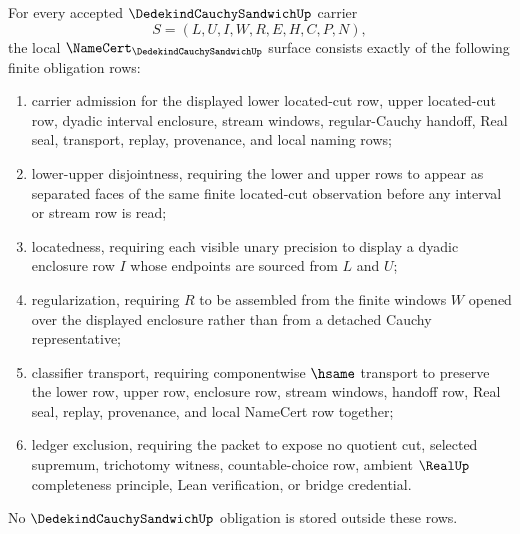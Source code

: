 \begin{theorem}
\label{thm:dedekind-cauchy-sandwich-namecert-obligations}
For every accepted $\DedekindCauchySandwichUp$ carrier
$$
S=(L,U,I,W,R,E,H,C,P,N),
$$
the local $\NameCert_{\DedekindCauchySandwichUp}$ surface consists exactly of the following finite obligation rows:
\begin{enumerate}
\item carrier admission for the displayed lower located-cut row, upper located-cut row, dyadic interval enclosure, stream windows, regular-Cauchy handoff, Real seal, transport, replay, provenance, and local naming rows;
\item lower-upper disjointness, requiring the lower and upper rows to appear as separated faces of the same finite located-cut observation before any interval or stream row is read;
\item locatedness, requiring each visible unary precision to display a dyadic enclosure row $I$ whose endpoints are sourced from $L$ and $U$;
\item regularization, requiring $R$ to be assembled from the finite windows $W$ opened over the displayed enclosure rather than from a detached Cauchy representative;
\item classifier transport, requiring componentwise $\hsame$ transport to preserve the lower row, upper row, enclosure row, stream windows, handoff row, Real seal, replay, provenance, and local NameCert row together;
\item ledger exclusion, requiring the packet to expose no quotient cut, selected supremum, trichotomy witness, countable-choice row, ambient $\RealUp$ completeness principle, Lean verification, or bridge credential.
\end{enumerate}
No $\DedekindCauchySandwichUp$ obligation is stored outside these rows.
\end{theorem}
